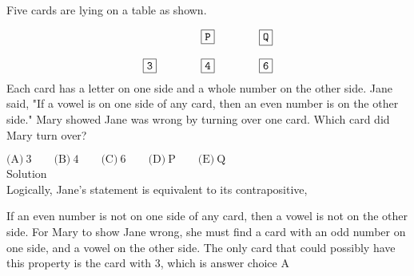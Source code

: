 

Five cards are lying on a table as shown.

\[\begin{matrix} & \qquad & \boxed{\tt{P}} & \qquad & \boxed{\tt{Q}} \\  \\ \boxed{\tt{3}} & \qquad & \boxed{\tt{4}} & \qquad & \boxed{\tt{6}} \end{matrix}\]
Each card has a letter on one side and a whole number on the other side. Jane said, "If a vowel is on one side of any card, then an even number is on the other side." Mary showed Jane was wrong by turning over one card. Which card did Mary turn over?

$\text{(A)}\ 3 \qquad \text{(B)}\ 4 \qquad \text{(C)}\ 6 \qquad \text{(D)}\ \text{P} \qquad \text{(E)}\ \text{Q}$
\\
Solution
\\
Logically, Jane's statement is equivalent to its contrapositive,

If an even number is not on one side of any card, then a vowel is not on the other side.
For Mary to show Jane wrong, she must find a card with an odd number on one side, and a vowel on the other side. The only card that could possibly have this property is the card with $3$, which is answer choice $\boxed{\text{A}}$
